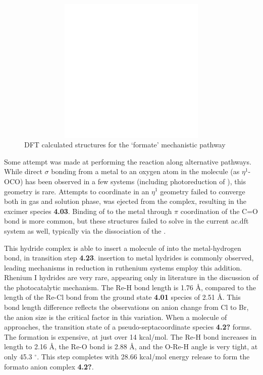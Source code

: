 \begin{figure}[!ht]
 \begin{center}
  \includegraphics[clip=true, width=120mm, height=70mm, keepaspectratio]{images/insertgraphic.eps}
 \end{center}
\caption{DFT calculated structures for the `formate' mechanistic pathway}
\label{fig.formatestruc}
\end{figure} 

Some attempt was made at performing the reaction along alternative pathways. While direct $\sigma$ bonding from a metal to an oxygen atom in the  molecule (as $\eta^1$-OCO) has been observed in a few systems (including photoreduction of )\autocite{lee2001, mauser2001, souter1997}, this geometry is rare\autocite{castrorodriguez2004, cokoja2011, gibson1996}. Attempts to coordinate  in an $\eta^1$ geometry failed to converge both in gas and solution phase,  was ejected from the complex, resulting in the excimer species \textbf{4.03}. Binding of  to the metal through $\pi$ coordination of the C=O bond is more common\autocite{cokoja2011, gibson1996}, but these structures failed to solve in the current \gls{ac.dft} system as well, typically via the dissociation of the .

This hydride complex is able to insert a molecule of  into the metal-hydrogen bond, in transition step \textbf{4.23}.  insertion to metal hydrides is commonly observed, leading mechanisms in  reduction in ruthenium systems employ this addition\autocite{creutz2007}. Rhenium I hydrides are very rare, appearing only in literature in the discussion of the photocatalytic mechanism. The Re-H bond length is 1.76 \r{A}, compared to the length of the Re-Cl bond from the ground state \textbf{4.01} species of 2.51 \r{A}. This bond length difference reflects the observations on anion change from Cl to Br, the anion size is the critical factor in this variation. When a molecule of  approaches, the transition state of a pseudo-septacoordinate species \textbf{4.2?} forms. The formation is expensive, at just over 14 kcal/mol. The Re-H bond increases in length to 2.16 \r{A}, the Re-O bond is 2.88 \r{A}, and the O-Re-H angle is very tight, at only 45.3 $^\circ$. This step completes with 28.66 kcal/mol energy release to form the formato anion complex \textbf{4.2?}. 

